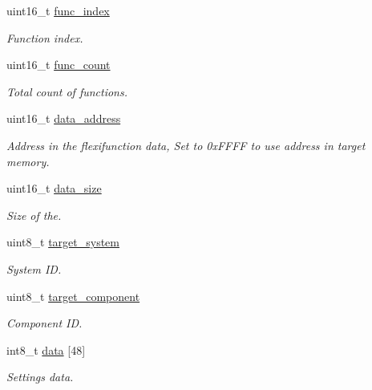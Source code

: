 \begin{DoxyCompactItemize}
\item 
uint16\+\_\+t \hyperlink{struct____mavlink__flexifunction__buffer__function__t_a62023a1fb908f32d546c8fb655b22bd5}{func\+\_\+index}
\begin{DoxyCompactList}\small\item\em Function index. \end{DoxyCompactList}\item 
uint16\+\_\+t \hyperlink{struct____mavlink__flexifunction__buffer__function__t_a358d33be3c5a548ae67b12f85af981ca}{func\+\_\+count}
\begin{DoxyCompactList}\small\item\em Total count of functions. \end{DoxyCompactList}\item 
uint16\+\_\+t \hyperlink{struct____mavlink__flexifunction__buffer__function__t_a69a40ddafbe8048752490a4198a6cdcf}{data\+\_\+address}
\begin{DoxyCompactList}\small\item\em Address in the flexifunction data, Set to 0x\+F\+F\+F\+F to use address in target memory. \end{DoxyCompactList}\item 
uint16\+\_\+t \hyperlink{struct____mavlink__flexifunction__buffer__function__t_a27389ea3f78570d1d28762f75426a9f8}{data\+\_\+size}
\begin{DoxyCompactList}\small\item\em Size of the. \end{DoxyCompactList}\item 
uint8\+\_\+t \hyperlink{struct____mavlink__flexifunction__buffer__function__t_a0f70169da8a7515a2dfebf2999bde198}{target\+\_\+system}
\begin{DoxyCompactList}\small\item\em System I\+D. \end{DoxyCompactList}\item 
uint8\+\_\+t \hyperlink{struct____mavlink__flexifunction__buffer__function__t_a0127ac653d81df45e28f12a1d9eeda1e}{target\+\_\+component}
\begin{DoxyCompactList}\small\item\em Component I\+D. \end{DoxyCompactList}\item 
int8\+\_\+t \hyperlink{struct____mavlink__flexifunction__buffer__function__t_abd265e21bd81dc57fd2355433375f6c4}{data} \mbox{[}48\mbox{]}
\begin{DoxyCompactList}\small\item\em Settings data. \end{DoxyCompactList}\end{DoxyCompactItemize}


